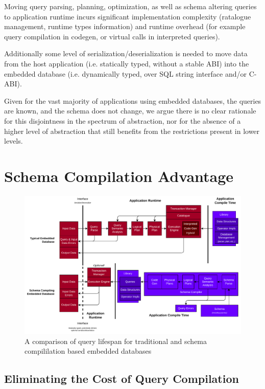 \documentclass[conference]{IEEEtran}
\begin{document}
Moving query parsing, planning, optimization, as well as schema altering queries to application
runtime incurs significant implementation complexity (ratalogue management, runtime types information)
and runtime overhead (for example query compilation in codegen, or virtual calls in interpreted queries).

Additionally some level of serialization/deserialization is needed to move data from the host application
(i.e. statically typed, without a stable ABI) into the embedded database (i.e. dynamically typed, over SQL string interface and/or C-ABI).

Given for the vast majority of applications using embedded databases, the queries are known, and the schema does not change, we argue there 
is no clear rationale for this disjointness in the spectrum of abstraction, nor for the absence
of a higher level of abstraction that still benefits from the restrictions present in lower levels.

\section{Schema Compilation Advantage}

\begin{figure}[b]
    \centering
    \includegraphics[width=\textwidth]{_diagrams/query_lifespan.pdf}
    \caption{A comparison of query lifespan for traditional and schema compililation based embedded databases}
    \label{fig:query-lifespan}
\end{figure}

\subsection{Eliminating the Cost of Query Compilation}
\end{document}

